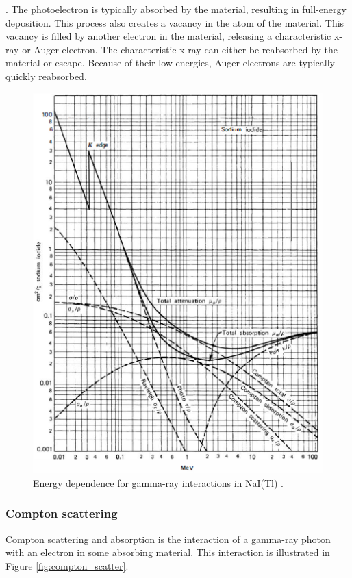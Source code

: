 . The photoelectron is typically absorbed by the material, resulting in full-energy deposition. This process also creates a vacancy in the atom of the material. This vacancy is filled by another electron in the material, releasing a characteristic x-ray or Auger electron. The characteristic x-ray can either be reabsorbed by the material or escape. Because of their low energies, Auger electrons are typically quickly reabsorbed.

\begin{figure}[H]
\centering
\includegraphics[width=0.75\linewidth]{images/energy_dependence_interactions}
\caption{Energy dependence for gamma-ray interactions in NaI(Tl) \cite{knoll}.}
\label{fig:energy_dependence_interactions}
\end{figure}

\subsubsection{Compton scattering}

Compton scattering and absorption is the interaction of a gamma-ray photon with an electron in some absorbing material. This interaction is illustrated in Figure \ref{fig:compton_scatter}. 



